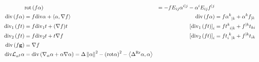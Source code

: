 \documentclass[a4paper,7pt]{scrartcl}
\newcommand{\rot}{\mathrm{rot}}
\renewcommand{\div}{\mathrm{div}}
\newcommand{\lie}{\mathcal{L}}
\newcommand{\laplace}[1]{\Delta^{#1}}
\newcommand{\lrotrot}{\laplace{\textup{Rr}}}
\newcommand{\gb}{\mathbf{g}}
\begin{document}
\begin{align*}
                &\rot\left( f\alpha \right) &= -fE_{ij}\alpha^{i|j} - \alpha^{i}E_{ij}f^{|j}\\
    \div\left( f\alpha \right) &= f\div\alpha + \left\langle \alpha, \nabla f \right\rangle
                &\div\left( f\alpha \right) &= f\tensor{\alpha}{^{k}_{|k}} + \alpha^{k}f_{|k}\\
    \div_{1}\left( f t \right) &= f\div_{1}t + (\nabla f)t
                &\left[  \div_{1}\left( f t \right) \right]_{i} &= f\tensor{t}{^{k}_{i|k}} + f^{|k}t_{ki}\\
    \div_{2}\left( f t \right) &= f\div_{2}t + t\nabla f
                &\left[  \div_{2}\left( f t \right) \right]_{i} &= f\tensor{t}{_{i}^{k}_{|k}} + f^{|k}t_{ik}\\
    \div\left( f \gb \right) &= \nabla f \\
    \div\lie_{\alpha^{\sharp}}\alpha &= \div\left( \nabla_{\alpha}\alpha +  \alpha\nabla\alpha \right)
                = \Delta\left\| \alpha \right\|^{2} - \left( \rot\alpha \right)^{2} - \left\langle \lrotrot\alpha , \alpha \right\rangle
  \end{align*}
\end{document}
